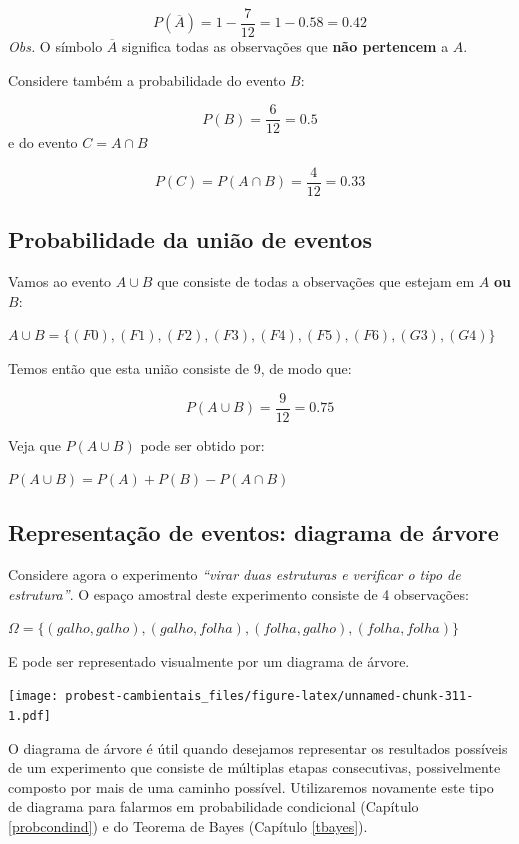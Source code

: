 \documentclass[
]{book}
\begin{document}
\[P(\overline{A}) = 1 - \frac{7}{12} = 1 - 0.58 = 0.42\]
\emph{Obs.} O símbolo \(\overline{A}\) significa todas as observações que \textbf{não pertencem} a \(A\).

Considere também a probabilidade do evento \(B\):

\[P(B) = \frac{6}{12} = 0.5\]
e do evento \(C = A \cap B\)

\[P(C) = P(A \cap B) = \frac{4}{12} = 0.33\]

\hypertarget{probabilidade-da-uniuxe3o-de-eventos}{%
\subsection{Probabilidade da união de eventos}\label{probabilidade-da-uniuxe3o-de-eventos}}

Vamos ao evento \(A \cup B\) que consiste de todas a observações que estejam em \(A\) \textbf{ou} \(B\):

\(A \cup B = \{(F0),(F1),(F2),(F3),(F4),(F5),(F6),(G3),(G4) \}\)

Temos então que esta união consiste de 9, de modo que:

\[P(A \cup B) = \frac{9}{12} = 0.75\]

Veja que \(P(A \cup B)\) pode ser obtido por:

\(P(A \cup B) = P(A) + P(B) - P(A \cap B)\)

\hypertarget{representauxe7uxe3o-de-eventos-diagrama-de-uxe1rvore}{%
\subsection{Representação de eventos: diagrama de árvore}\label{representauxe7uxe3o-de-eventos-diagrama-de-uxe1rvore}}

Considere agora o experimento \emph{``virar duas estruturas e verificar o tipo de estrutura''}. O espaço amostral deste experimento consiste de 4 observações:

\(\Omega = \{(galho, galho), (galho, folha), (folha, galho), (folha, folha)\}\)

E pode ser representado visualmente por um diagrama de árvore.

\texttt{[image: probest-cambientais\_files/figure-latex/unnamed-chunk-311-1.pdf]}

O diagrama de árvore é útil quando desejamos representar os resultados possíveis de um experimento que consiste de múltiplas etapas consecutivas, possivelmente composto por mais de uma caminho possível. Utilizaremos novamente este tipo de diagrama para falarmos em probabilidade condicional (Capítulo \ref{probcondind}) e do Teorema de Bayes (Capítulo \ref{tbayes}).
\end{document}
